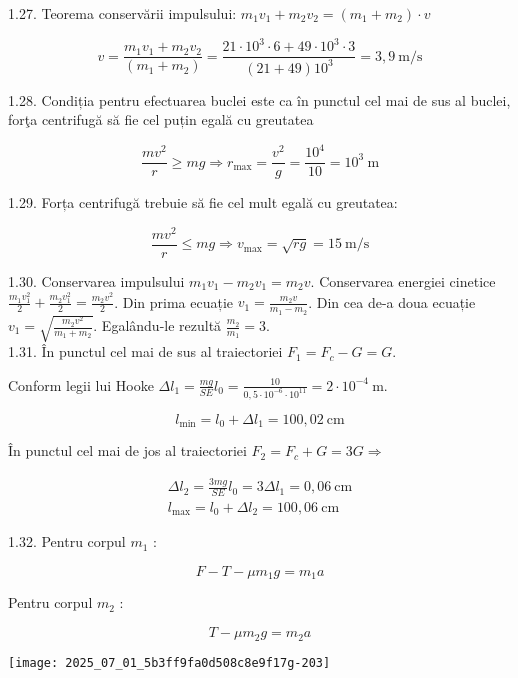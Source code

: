 1.27. Teorema conservării impulsului: $m_{1} v_{1}+m_{2} v_{2}=\left(m_{1}+m_{2}\right) \cdot v$

$$
v=\frac{m_{1} v_{1}+m_{2} v_{2}}{\left(m_{1}+m_{2}\right)}=\frac{21 \cdot 10^{3} \cdot 6+49 \cdot 10^{3} \cdot 3}{(21+49) 10^{3}}=3,9 \mathrm{~m} / \mathrm{s}
$$

1.28. Condiția pentru efectuarea buclei este ca în punctul cel mai de sus al buclei, forţa centrifugă să fie cel puțin egală cu greutatea

$$
\frac{m v^{2}}{r} \geq m g \Rightarrow r_{\max }=\frac{v^{2}}{g}=\frac{10^{4}}{10}=10^{3} \mathrm{~m}
$$

1.29. Forța centrifugă trebuie să fie cel mult egală cu greutatea:

$$
\frac{m v^{2}}{r} \leq m g \Rightarrow v_{\max }=\sqrt{r g}=15 \mathrm{~m} / \mathrm{s}
$$

1.30. Conservarea impulsului $m_{1} v_{1}-m_{2} v_{1}=m_{2} v$. Conservarea energiei cinetice $\frac{m_{1} v_{1}^{2}}{2}+\frac{m_{2} v_{1}^{2}}{2}=\frac{m_{2} v^{2}}{2}$. Din prima ecuație $v_{1}=\frac{m_{2} v}{m_{1}-m_{2}}$. Din cea de-a doua ecuație $v_{1}=\sqrt{\frac{m_{2} v^{2}}{m_{1}+m_{2}}}$. Egalându-le rezultă $\frac{m_{2}}{m_{1}}=3$.\\
1.31. În punctul cel mai de sus al traiectoriei $F_{1}=F_{c}-G=G$.

Conform legii lui Hooke $\Delta l_{1}=\frac{m g}{S E} l_{0}=\frac{10}{0,5 \cdot 10^{-6} \cdot 10^{11}}=2 \cdot 10^{-4} \mathrm{~m}$.

$$
l_{\min }=l_{0}+\Delta l_{1}=100,02 \mathrm{~cm}
$$

În punctul cel mai de jos al traiectoriei $F_{2}=F_{c}+G=3 G \Rightarrow$

$$
\begin{gathered}
\Delta l_{2}=\frac{3 m g}{S E} l_{0}=3 \Delta l_{1}=0,06 \mathrm{~cm} \\
l_{\max }=l_{0}+\Delta l_{2}=100,06 \mathrm{~cm}
\end{gathered}
$$

1.32. Pentru corpul $m_{1}$ :

$$
F-T-\mu m_{1} g=m_{1} a
$$

Pentru corpul $m_{2}$ :

$$
T-\mu m_{2} g=m_{2} a
$$

\begin{center}
\texttt{[image: 2025\_07\_01\_5b3ff9fa0d508c8e9f17g-203]}
\end{center}

